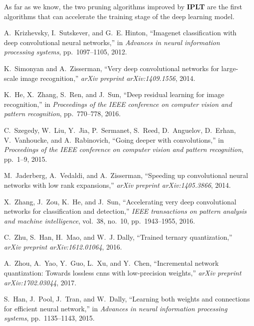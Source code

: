 \documentclass[runningheads]{llncs}
\begin{document}
As far as we know, the two pruning algorithms improved by \textbf{IPLT} are the first algorithms that can accelerate the training stage of the deep learning model.




%
%
%
% 
% 
%
\begin{thebibliography}{8}
A.~Krizhevsky, I.~Sutskever, and G.~E. Hinton, ``Imagenet classification with
  deep convolutional neural networks,'' in {\em Advances in neural information
  processing systems}, pp.~1097--1105, 2012.

K.~Simonyan and A.~Zisserman, ``Very deep convolutional networks for
  large-scale image recognition,'' {\em arXiv preprint arXiv:1409.1556}, 2014.

K.~He, X.~Zhang, S.~Ren, and J.~Sun, ``Deep residual learning for image
  recognition,'' in {\em Proceedings of the IEEE conference on computer vision
  and pattern recognition}, pp.~770--778, 2016.

C.~Szegedy, W.~Liu, Y.~Jia, P.~Sermanet, S.~Reed, D.~Anguelov, D.~Erhan,
  V.~Vanhoucke, and A.~Rabinovich, ``Going deeper with convolutions,'' in {\em
  Proceedings of the IEEE conference on computer vision and pattern
  recognition}, pp.~1--9, 2015.

M.~Jaderberg, A.~Vedaldi, and A.~Zisserman, ``Speeding up convolutional neural
  networks with low rank expansions,'' {\em arXiv preprint arXiv:1405.3866},
  2014.

X.~Zhang, J.~Zou, K.~He, and J.~Sun, ``Accelerating very deep convolutional
  networks for classification and detection,'' {\em IEEE transactions on
  pattern analysis and machine intelligence}, vol.~38, no.~10, pp.~1943--1955,
  2016.

C.~Zhu, S.~Han, H.~Mao, and W.~J. Dally, ``Trained ternary quantization,'' {\em
  arXiv preprint arXiv:1612.01064}, 2016.

A.~Zhou, A.~Yao, Y.~Guo, L.~Xu, and Y.~Chen, ``Incremental network
  quantization: Towards lossless cnns with low-precision weights,'' {\em arXiv
  preprint arXiv:1702.03044}, 2017.

S.~Han, J.~Pool, J.~Tran, and W.~Dally, ``Learning both weights and connections
  for efficient neural network,'' in {\em Advances in neural information
  processing systems}, pp.~1135--1143, 2015.


\end{thebibliography}
\end{document}
